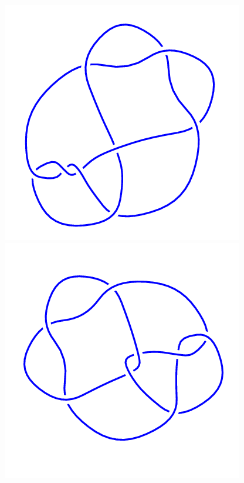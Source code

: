 \begin{figure}[H]
\begin{minipage}[b]{.18\linewidth}
    \end{minipage}
    \begin{minipage}[b]{.18\linewidth}
        \centering
        \includegraphics[width=\linewidth]{../data/8_9.png}
    \end{minipage}
    \begin{minipage}[b]{.18\linewidth}
        \centering
        \includegraphics[width=\linewidth]{../data/8_10.png}

\end{minipage}
\end{figure}
